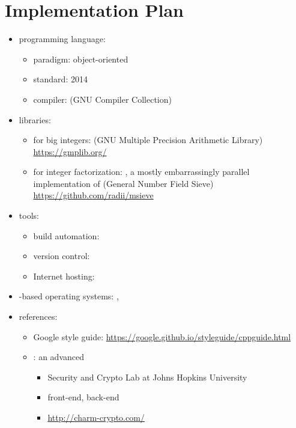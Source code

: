 \section{Implementation Plan}


\begin{frame}
\begin{itemize}
\item programming language: 
  \begin{itemize}
  \item paradigm: object-oriented
  \item standard: 2014
  \item compiler:  (GNU Compiler Collection)
  \end{itemize}
\item libraries:
  \begin{itemize}
  \item for big integers: 
    (GNU Multiple Precision Arithmetic Library) \\
    \url{https://gmplib.org/}
  \item for integer factorization: ,
    a mostly embarrassingly parallel
    implementation of 
    (General Number Field Sieve) \\
    \url{https://github.com/radii/msieve}
  \end{itemize}
\end{itemize}
\end{frame}

\begin{frame}
\begin{itemize}
\item tools:
  \begin{itemize}
  \item build automation: 
  \item version control: 
  \item Internet hosting: \github \\ \crygithub
  \end{itemize}
\item {}-based operating systems:
  , 
\item references:
\begin{itemize}
\item Google  style guide:
    \url{https://google.github.io/styleguide/cppguide.html}
\item {}: an advanced \cf
  \begin{itemize}
  \item Security and Crypto Lab at Johns Hopkins University
  \item {} front-end,  back-end
  \item \url{http://charm-crypto.com/}
  \end{itemize}
\end{itemize}
\end{itemize}
\end{frame}
